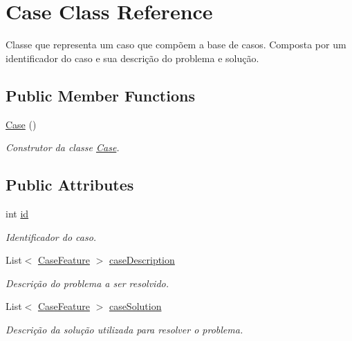 \hypertarget{class_case}{}\section{Case Class Reference}
\label{class_case}


Classe que representa um caso que compõem a base de casos. Composta por um identificador do caso e sua descrição do problema e solução.  


\subsection*{Public Member Functions}
\begin{DoxyCompactItemize}
\item 
\hyperlink{class_case_a78f4e108e49ef2fed453aa3e6cdd1ada}{Case} ()
\begin{DoxyCompactList}\small\item\em Construtor da classe \hyperlink{class_case}{Case}. \end{DoxyCompactList}\end{DoxyCompactItemize}
\subsection*{Public Attributes}
\begin{DoxyCompactItemize}
\item 
int \hyperlink{class_case_ac1ad667fc94d57692c17f5e3445096fc}{id}
\begin{DoxyCompactList}\small\item\em Identificador do caso. \end{DoxyCompactList}\item 
List$<$ \hyperlink{class_case_feature}{Case\+Feature} $>$ \hyperlink{class_case_a12be58e57891febe52b147a9266e54cb}{case\+Description}
\begin{DoxyCompactList}\small\item\em Descrição do problema a ser resolvido. \end{DoxyCompactList}\item 
List$<$ \hyperlink{class_case_feature}{Case\+Feature} $>$ \hyperlink{class_case_a0aa512e57a95843a20dd5190b043d793}{case\+Solution}
\begin{DoxyCompactList}\small\item\em Descrição da solução utilizada para resolver o problema. \end{DoxyCompactList}\end{DoxyCompactItemize}


